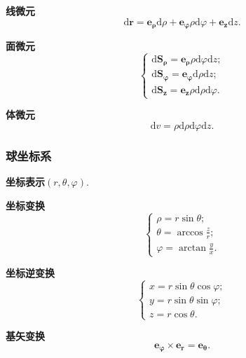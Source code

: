 \textbf{线微元}
\begin{equation}
    \mathrm{d}\bm{r}=\bm{e_\rho}\mathrm{d}\rho+\bm{e_\varphi}\rho\mathrm{d}\varphi+\bm{e_z}\mathrm{d}z.
\end{equation}

\textbf{面微元}
\begin{equation}
    \begin{cases}
        \mathrm{d}\bm{S_\rho}=\bm{e_\rho}\rho\mathrm{d}\varphi\mathrm{d}z; \\
        \mathrm{d}\bm{S_\varphi}=\bm{e_\varphi}\mathrm{d}\rho\mathrm{d}z;  \\
        \mathrm{d}\bm{S_z}=\bm{e_z}\rho\mathrm{d}\rho\mathrm{d}\varphi.
    \end{cases}
\end{equation}

\textbf{体微元}
\begin{equation}
    \mathrm{d}v=\rho\mathrm{d}\rho\mathrm{d}\varphi\mathrm{d}z.
\end{equation}

\subsubsection{球坐标系}
\textbf{坐标表示}\quad $(r, \theta, \varphi)$.

\textbf{坐标变换}
\begin{equation}
    \begin{cases}
        \rho=r\sin\theta;          \\
        \theta=\arccos\frac{z}{r}; \\
        \varphi=\arctan\frac{y}{x}.
    \end{cases}
\end{equation}

\textbf{坐标逆变换}
\begin{equation}
    \begin{cases}
        x=r\sin\theta\cos\varphi; \\
        y=r\sin\theta\sin\varphi; \\
        z=r\cos\theta.
    \end{cases}
\end{equation}

\textbf{基矢变换}
\begin{equation}
    \bm{e_\varphi}\times\bm{e_r}=\bm{e_\theta}.
\end{equation}

